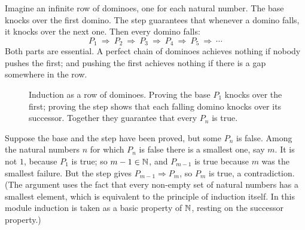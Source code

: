 \begin{intuition}[Dominoes]
Imagine an infinite row of dominoes, one for each natural number. The base knocks over the first domino. The step
guarantees that whenever a domino falls, it knocks over the next one. Then every domino falls:
\[
P_1\ \Longrightarrow\ P_2\ \Longrightarrow\ P_3\ \Longrightarrow\ P_4\ \Longrightarrow\ P_5\ \Longrightarrow\ \cdots
\]
Both parts are essential. A perfect chain of dominoes achieves nothing if nobody pushes the first; and pushing the
first achieves nothing if there is a gap somewhere in the row.
\end{intuition}

\begin{figure}[ht]
\centering
{}
\caption{Induction as a row of dominoes. Proving the base $P_1$ knocks over the first; proving the step shows that each
falling domino knocks over its successor. Together they guarantee that every $P_n$ is true.}
\label{fig:dominoes}
\end{figure}

\begin{external}
Suppose the base and the step have been proved, but some $P_n$ is false. Among the natural numbers $n$ for which
$P_n$ is false there is a smallest one, say $m$. It is not $1$, because $P_1$ is true; so $m-1\in\mathbb{N}$, and $P_{m-1}$ is true
because $m$ was the smallest failure. But the step gives $P_{m-1}\Rightarrow P_m$, so $P_m$ is true, a contradiction.
(The argument uses the fact that every non-empty set of natural numbers has a smallest element, which is
equivalent to the principle of induction itself. In this module induction is taken as a basic property of $\mathbb{N}$,
resting on the successor property.)
\end{external}

